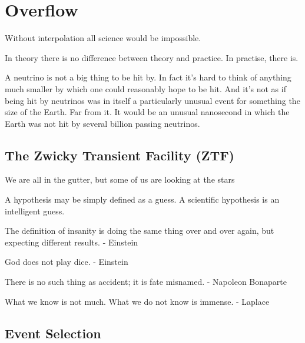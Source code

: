 \setchapterpreamble[u]{\margintoc}
\chapter{Overflow}
\begin{fquote} Without interpolation all science would be impossible. 
\end{fquote}
\begin{fquote} In theory there is no difference between theory and practice. In practise, there is.
\end{fquote}
\begin{fquote} A neutrino is not a big thing to be hit by. In fact it's hard to think of anything much smaller by which one could reasonably hope to be hit. And it's not as if being hit by neutrinos was in itself a particularly unusual event for something the size of the Earth. Far from it. It would be an unusual nanosecond in which the Earth was not hit by several billion passing neutrinos.
\end{fquote}
\section{The Zwicky Transient Facility (ZTF)}
\begin{fquote}We are all in the gutter, but some of us are looking at the stars
\end{fquote}

\begin{fquote} A hypothesis may be simply defined as a guess. A scientific hypothesis is an intelligent guess. 
\end{fquote}

The definition of insanity is doing the same thing over and over again, but expecting different results. - Einstein

God does not play dice. - Einstein

There is no such thing as accident; it is fate misnamed. - Napoleon Bonaparte




What we know is not much. What we do not know is immense. - Laplace

\section{Event Selection}

